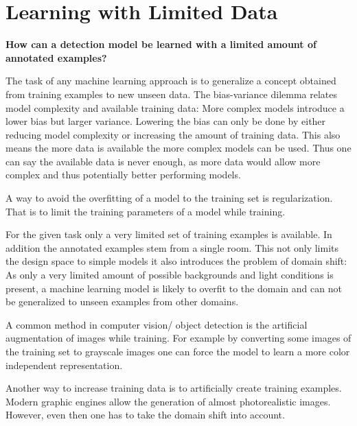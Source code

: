 \chapter{Learning with Limited Data}
\label{sec:training}

\begin{center}
	\textbf{How can a detection model be learned with a limited amount of annotated examples?}
\end{center}


The task of any machine learning approach is to generalize a concept obtained from training examples to new unseen data.
The bias-variance dilemma  relates model complexity and available training data: More complex models introduce a lower bias but larger variance. Lowering the bias can only be done by either reducing model complexity or increasing the amount of training data. This also means the more data is available the more complex models can be used. Thus one can say the available data is never enough, as more data would allow more complex and thus potentially better performing models.

A way to avoid the overfitting of a model to the training set is regularization. That is to limit the training parameters of a model while training.

For the given task only a very limited set of training examples is available. In addition the annotated examples stem from a single room. This not only limits the design space to simple models it also introduces the problem of domain shift: As only a very limited amount of possible backgrounds and light conditions is present, a machine learning model is likely to overfit to the domain and can not be generalized to unseen examples from other domains. 

A common method in computer vision/ object detection is the artificial augmentation of images while training. For example by converting some images of the training set to grayscale images one can force the model to learn a more color independent representation.

Another way to increase training data is to artificially create training examples. Modern graphic engines allow the generation of almost photorealistic images. However, even then one has to take the domain shift into account.



